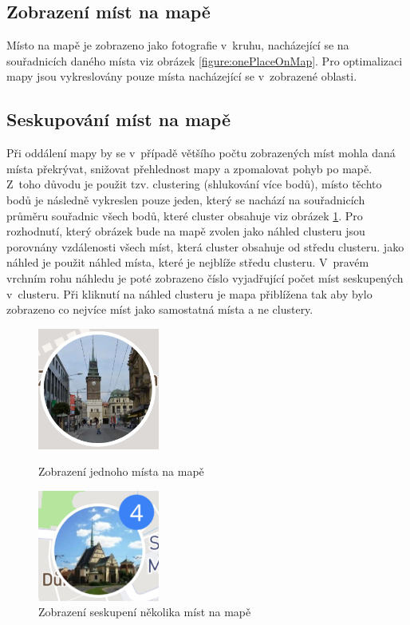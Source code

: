 \documentclass[12pt, a4paper,
  oneside,      %
]{report}
\begin{document}
\subsection{Zobrazení míst na mapě}
Místo na mapě je zobrazeno jako fotografie v~kruhu, nacházející se na souřadnicích daného místa viz obrázek \ref{figure:onePlaceOnMap}. Pro optimalizaci mapy jsou vykreslovány pouze místa nacházející se v~zobrazené oblasti.
\subsection{Seskupování míst na mapě}
Při oddálení mapy by se v~případě většího počtu zobrazených míst mohla daná místa překrývat, snižovat přehlednost mapy a zpomalovat pohyb po mapě. Z~toho důvodu je použit tzv. clustering (shlukování více bodů), místo těchto bodů je následně vykreslen pouze jeden, který se nachází na souřadnicích průměru souřadnic všech bodů, které cluster obsahuje viz obrázek \ref{figure:clusterOnMap}. Pro rozhodnutí, který obrázek bude na mapě zvolen jako náhled clusteru jsou porovnány vzdálenosti všech míst, která cluster obsahuje od středu clusteru. jako náhled je použit náhled místa, které je nejblíže středu clusteru. V~pravém vrchním rohu náhledu je poté zobrazeno číslo vyjadřující počet míst seskupených v~clusteru. Při kliknutí na náhled clusteru je mapa přiblížena tak aby bylo zobrazeno co nejvíce míst jako samostatná místa a ne clustery.

\begin{figure}[!h]

	\centering
	\includegraphics[width=4cm]{images/place.png}
	\caption{Zobrazení jednoho místa na mapě}\label{figure:onePlaceOnMap}
	\includegraphics[width=4cm]{images/places_cluster.png}
	\caption{Zobrazení seskupení několika míst na mapě}\label{figure:clusterOnMap}

\end{figure}
\end{document}
